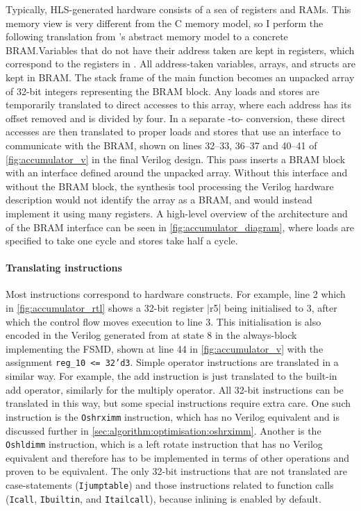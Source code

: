 Typically, HLS-generated hardware consists of a sea of registers and RAMs.  This
memory view is very different from the C memory model, so I perform the
following translation from \compcert{}'s abstract memory model to a concrete
\gls{BRAM}.\@ Variables that do not have their address taken are kept in
registers, which correspond to the registers in \rtl{}.  All address-taken
variables, arrays, and structs are kept in \gls{BRAM}.  The stack frame of the main
function becomes an unpacked array of 32-bit integers representing the
\gls{BRAM} block.  Any loads and stores are temporarily translated to direct
accesses to this array, where each address has its offset removed and is divided
by four.  In a separate \htl{}-to-\htl{} conversion, these direct accesses are
then translated to proper loads and stores that use an interface to communicate
with the \gls{BRAM}, shown on lines 32--33, 36--37 and 40--41 of
\cref{fig:accumulator_v} in the final Verilog design.  This pass inserts a
\gls{BRAM} block with an interface defined around the unpacked array.  Without
this interface and without the \gls{BRAM} block, the synthesis tool processing
the Verilog hardware description would not identify the array as a \gls{BRAM},
and would instead implement it using many registers.  A high-level overview of
the architecture and of the \gls{BRAM} interface can be seen in
\cref{fig:accumulator_diagram}, where loads are specified to take one cycle and
stores take half a cycle.

\paragraph{Translating instructions}

Most \rtl{} instructions correspond to hardware constructs.  For example, line 2
which in \cref{fig:accumulator_rtl} shows a 32-bit register \rtlinline|r5| being
initialised to 3, after which the control flow moves execution to line 3. This
initialisation is also encoded in the Verilog generated from \htl{} at state 8
in the always-block implementing the \gls{FSMD}, shown at line 44 in
\cref{fig:accumulator_v} with the assignment \texttt{reg\_10 <= 32'd3}.  Simple
operator instructions are translated in a similar way.  For example, the add
instruction is just translated to the built-in add operator, similarly for the
multiply operator.  All 32-bit instructions can be translated in this way, but
some special instructions require extra care. One such instruction is the
\texttt{Oshrximm} instruction, which has no Verilog equivalent and is discussed
further in \cref{sec:algorithm:optimisation:oshrximm}. Another is the
\texttt{Oshldimm} instruction, which is a left rotate instruction that has no
Verilog equivalent and therefore has to be implemented in terms of other
operations and proven to be equivalent.  The only 32-bit instructions that are
not translated are case-statements (\texttt{Ijumptable}) and those instructions
related to function calls (\texttt{Icall}, \texttt{Ibuiltin}, and
\texttt{Itailcall}), because inlining is enabled by default.

